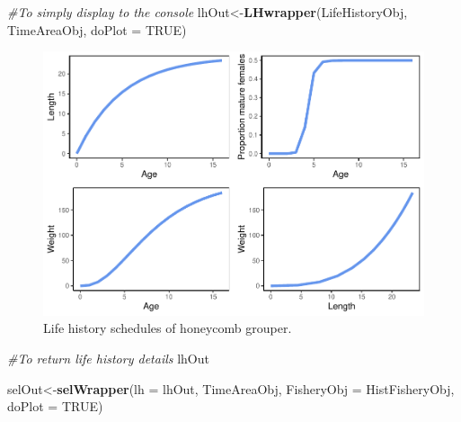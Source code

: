 \documentclass[
]{book}
\newenvironment{Shaded}{\begin{snugshade}}{\end{snugshade}}
\newcommand{\AttributeTok}[1]{\textcolor[rgb]{0.13,0.29,0.53}{#1}}
\newcommand{\CommentTok}[1]{\textcolor[rgb]{0.56,0.35,0.01}{\textit{#1}}}
\newcommand{\ConstantTok}[1]{\textcolor[rgb]{0.56,0.35,0.01}{#1}}
\newcommand{\FunctionTok}[1]{\textcolor[rgb]{0.13,0.29,0.53}{\textbf{#1}}}
\newcommand{\NormalTok}[1]{#1}
\newcommand{\OtherTok}[1]{\textcolor[rgb]{0.56,0.35,0.01}{#1}}
\begin{document}
\begin{Shaded}
\begin{Highlighting}[]
\CommentTok{\#To simply display to the console}
\NormalTok{lhOut}\OtherTok{\textless{}{-}}\FunctionTok{LHwrapper}\NormalTok{(LifeHistoryObj, TimeAreaObj, }\AttributeTok{doPlot =} \ConstantTok{TRUE}\NormalTok{)}
\end{Highlighting}
\end{Shaded}

\begin{figure}
\centering
\includegraphics{_main_files/figure-latex/lhgrouper-1.pdf}
\caption{\label{fig:lhgrouper}Life history schedules of honeycomb grouper.}
\end{figure}

\begin{Shaded}
\begin{Highlighting}[]
\CommentTok{\#To return life history details}
\NormalTok{lhOut}
\end{Highlighting}
\end{Shaded}

\begin{Shaded}
\begin{Highlighting}[]
\NormalTok{selOut}\OtherTok{\textless{}{-}}\FunctionTok{selWrapper}\NormalTok{(}\AttributeTok{lh =}\NormalTok{ lhOut, TimeAreaObj, }\AttributeTok{FisheryObj =}\NormalTok{ HistFisheryObj, }\AttributeTok{doPlot =} \ConstantTok{TRUE}\NormalTok{)}
\end{Highlighting}
\end{Shaded}
\end{document}
